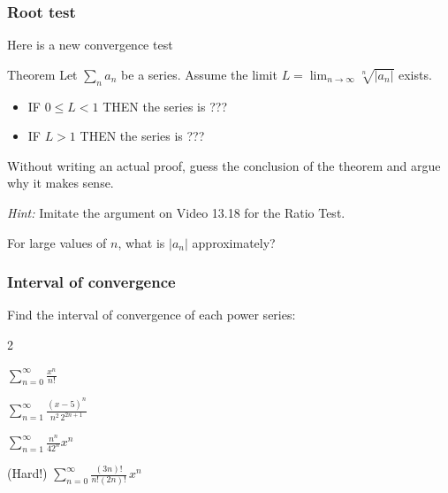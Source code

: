 \documentclass[14pt]{beamer}
\begin{document}
\begin{frame}[t]
	\fontsize{13}{13}\selectfont
	\frametitle{Root test}

	Here is a new convergence test
	\begin{block}{Theorem}
		Let $\displaystyle \sum_{n}a_{n}$ be a series. Assume the limit
		$\displaystyle L= \lim_{n \to \infty}\sqrt[n]{|a_{n}|}$ exists.
		\begin{itemize}
			\item IF $0 \leq L <1$ THEN the series is ???

			\item IF $L > 1$ THEN the series is ???
		\end{itemize}
	\end{block}

	Without writing an actual proof, guess the conclusion of the theorem and argue
	why it makes sense.

	\emph{Hint:} Imitate the argument on Video 13.18 for the Ratio Test.

	For large values of $n$, what is $|a_{n}|$ approximately?
\end{frame}

\begin{frame}[t]
	\frametitle{Interval of convergence}

	Find the interval of convergence of each power series:

	\begin{enumerate}
	\end{enumerate}
\end{frame}
\end{document}
